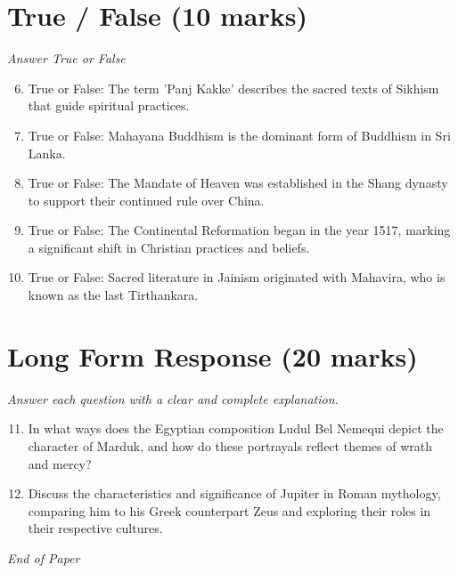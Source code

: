 \documentclass[12pt]{article}
\begin{document}
\section*{True / False (10 marks)}
\textit{Answer True or False}
\begin{enumerate}[label=\arabic*.]
\setcounter{enumi}{5}
\item True or False: The term 'Panj Kakke' describes the sacred texts of Sikhism that guide spiritual practices.
\item True or False: Mahayana Buddhism is the dominant form of Buddhism in Sri Lanka.
\item True or False: The Mandate of Heaven was established in the Shang dynasty to support their continued rule over China.
\item True or False: The Continental Reformation began in the year 1517, marking a significant shift in Christian practices and beliefs.
\item True or False: Sacred literature in Jainism originated with Mahavira, who is known as the last Tirthankara.
\end{enumerate}

\section*{Long Form Response (20 marks)}
\textit{Answer each question with a clear and complete explanation.}
\begin{enumerate}[label=\arabic*.]
\setcounter{enumi}{10}
\item In what ways does the Egyptian composition Ludul Bel Nemequi depict the character of Marduk, and how do these portrayals reflect themes of wrath and mercy?
\item Discuss the characteristics and significance of Jupiter in Roman mythology, comparing him to his Greek counterpart Zeus and exploring their roles in their respective cultures.
\end{enumerate}

\vfill
\noindent\textit{End of Paper}
\end{document}
